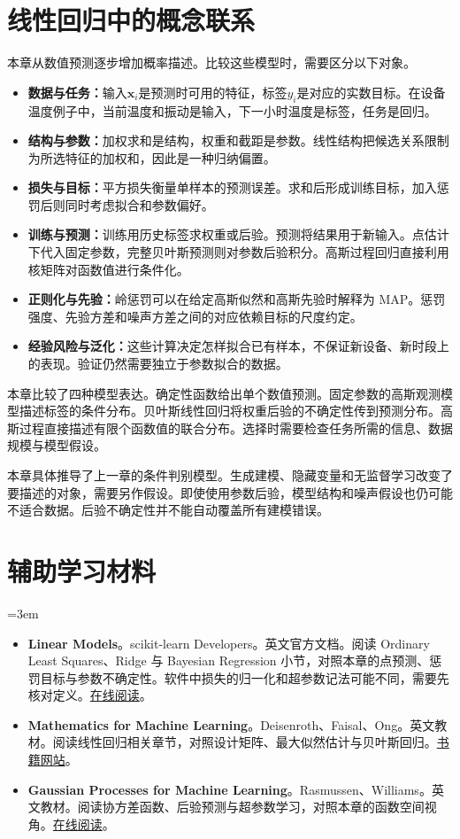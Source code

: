 \section{线性回归中的概念联系}
本章从数值预测逐步增加概率描述。比较这些模型时，需要区分以下对象。
\begin{itemize}
 \item \textbf{数据与任务：}输入$\bm x_i$是预测时可用的特征，标签$y_i$是对应的实数目标。在设备温度例子中，当前温度和振动是输入，下一小时温度是标签，任务是回归。
 \item \textbf{结构与参数：}加权求和是结构，权重和截距是参数。线性结构把候选关系限制为所选特征的加权和，因此是一种归纳偏置。
 \item \textbf{损失与目标：}平方损失衡量单样本的预测误差。求和后形成训练目标，加入惩罚后则同时考虑拟合和参数偏好。
 \item \textbf{训练与预测：}训练用历史标签求权重或后验。预测将结果用于新输入。点估计下代入固定参数，完整贝叶斯预测则对参数后验积分。高斯过程回归直接利用核矩阵对函数值进行条件化。
 \item \textbf{正则化与先验：}岭惩罚可以在给定高斯似然和高斯先验时解释为 MAP。惩罚强度、先验方差和噪声方差之间的对应依赖目标的尺度约定。
 \item \textbf{经验风险与泛化：}这些计算决定怎样拟合已有样本，不保证新设备、新时段上的表现。验证仍然需要独立于参数拟合的数据。
\end{itemize}

本章比较了四种模型表达。确定性函数给出单个数值预测。固定参数的高斯观测模型描述标签的条件分布。贝叶斯线性回归将权重后验的不确定性传到预测分布。高斯过程直接描述有限个函数值的联合分布。选择时需要检查任务所需的信息、数据规模与模型假设。

本章具体推导了上一章的条件判别模型。生成建模、隐藏变量和无监督学习改变了要描述的对象，需要另作假设。即使使用参数后验，模型结构和噪声假设也仍可能不适合数据。后验不确定性并不能自动覆盖所有建模错误。

\section*{辅助学习材料}
\begingroup
\emergencystretch=3em
\begin{itemize}
 \item \textbf{Linear Models}。scikit-learn Developers。英文官方文档。阅读 Ordinary Least Squares、Ridge 与 Bayesian Regression 小节，对照本章的点预测、惩罚目标与参数不确定性。软件中损失的归一化和超参数记法可能不同，需要先核对定义。\href{https://scikit-learn.org/stable/modules/linear\_model.html}{在线阅读}。
 \item \textbf{Mathematics for Machine Learning}。Deisenroth、Faisal、Ong。英文教材。阅读线性回归相关章节，对照设计矩阵、最大似然估计与贝叶斯回归。\href{https://mml-book.com}{书籍网站}。
 \item \textbf{Gaussian Processes for Machine Learning}。Rasmussen、Williams。英文教材。阅读协方差函数、后验预测与超参数学习，对照本章的函数空间视角。\href{https://gaussianprocess.org/gpml/}{在线阅读}。
\end{itemize}
\endgroup
